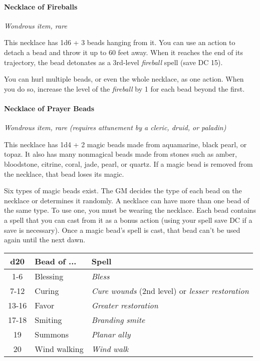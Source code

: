 \documentclass[
]{article}
\begin{document}
\hypertarget{necklace-of-fireballs}{%
\paragraph{Necklace of Fireballs}\label{necklace-of-fireballs}}

\emph{Wondrous item, rare}

This necklace has 1d6 + 3 beads hanging from it. You can use an action
to detach a bead and throw it up to 60 feet away. When it reaches the
end of its trajectory, the bead detonates as a 3rd-level \emph{fireball}
spell (save DC 15).

You can hurl multiple beads, or even the whole necklace, as one action.
When you do so, increase the level of the \emph{fireball} by 1 for each
bead beyond the first.

\hypertarget{necklace-of-prayer-beads}{%
\paragraph{Necklace of Prayer Beads}\label{necklace-of-prayer-beads}}

\emph{Wondrous item, rare (requires attunement by a cleric, druid, or
paladin)}

This necklace has 1d4 + 2 magic beads made from aquamarine, black pearl,
or topaz. It also has many nonmagical beads made from stones such as
amber, bloodstone, citrine, coral, jade, pearl, or quartz. If a magic
bead is removed from the necklace, that bead loses its magic.

Six types of magic beads exist. The GM decides the type of each bead on
the necklace or determines it randomly. A necklace can have more than
one bead of the same type. To use one, you must be wearing the necklace.
Each bead contains a spell that you can cast from it as a bonus action
(using your spell save DC if a save is necessary). Once a magic bead's
spell is cast, that bead can't be used again until the next dawn.

\begin{longtable}[]{@{}cll@{}}
\toprule
d20 & Bead of ... & Spell\tabularnewline
\midrule
\endhead
1-6 & Blessing & \emph{Bless}\tabularnewline
7-12 & Curing & \emph{Cure} \emph{wounds} (2nd level) or \emph{lesser
restoration}\tabularnewline
13-16 & Favor & \emph{Greater restoration}\tabularnewline
17-18 & Smiting & \emph{Branding smite}\tabularnewline
19 & Summons & \emph{Planar} \emph{ally}\tabularnewline
20 & Wind walking & \emph{Wind} \emph{walk}\tabularnewline
\bottomrule
\end{longtable}
\end{document}
